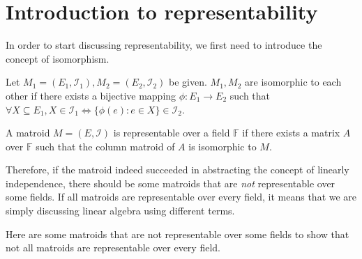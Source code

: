 \section{Introduction to representability}

%

In order to start discussing representability, we first need to introduce the concept of isomorphism.
\begin{defn}
Let $M_1 = (E_1, \mathcal{I}_1), M_2 = (E_2, \mathcal{I}_2)$ be given.
$M_1, M_2$ are isomorphic to each other if there exists a bijective mapping $\phi: E_1 \rightarrow E_2$ such that
$\forall X \subseteq E_1, X \in \mathcal{I}_1 \iff \{ \phi(e) : e \in X \} \in \mathcal{I}_2$.
\end{defn}

\begin{defn}
A matroid $M = (E, \mathcal{I})$ is representable over a field $\mathbb{F}$ if 
there exists a matrix $A$ over $\mathbb{F}$ such that the column matroid of $A$ is isomorphic to $M$.
\end{defn}

Therefore, if the matroid indeed succeeded in abstracting the concept of linearly independence, 
there should be some matroids that are \textit{not} representable over some fields.
If all matroids are representable over every field, it means that we are simply discussing linear algebra using different terms.

Here are some matroids that are not representable over some fields to show that not all matroids are representable over every field.


